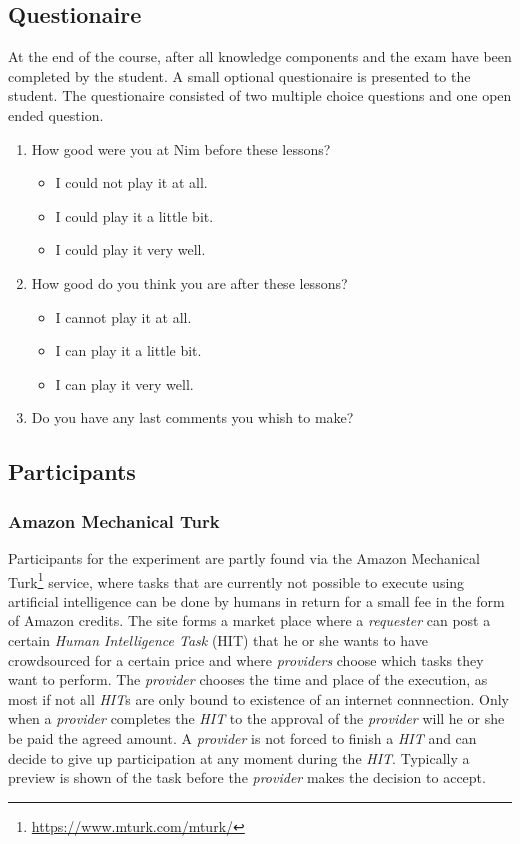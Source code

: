 \subsection{Questionaire}
\label{sec:setup_questionaire}
At the end of the course, after all knowledge components and the exam have been
completed by the student. A small optional questionaire is presented to the
student. The questionaire consisted of two multiple choice questions and one
open ended question.
\begin{enumerate}
	\item How good were you at Nim before these lessons?
		\begin{itemize}
			\item I could not play it at all.
			\item I could play it a little bit.
			\item I could play it very well.
		\end{itemize}
	\item How good do you think you are after these lessons?
		\begin{itemize}
			\item I cannot play it at all.
			\item I can play it a little bit.
			\item I can play it very well.
		\end{itemize}
	\item Do you have any last comments you whish to make?
\end{enumerate}
\subsection{Participants}
\label{sec:setup_dissemination}
\subsubsection{Amazon Mechanical Turk}
Participants for the experiment are partly found via the Amazon Mechanical
Turk\footnote{\url{https://www.mturk.com/mturk/}} service, where tasks that are
currently not possible to execute using artificial intelligence can be done by
humans in return for a small fee in the form of Amazon credits. The site forms
a market place where a \emph{requester} can post a certain \emph{Human
Intelligence Task} (HIT) that he or she wants to have crowdsourced for a
certain price and where \emph{providers} choose which tasks they want to perform.
The \emph{provider} chooses the time and place of the execution, as most if not
all \emph{HIT}s are only bound to existence of an internet connnection. Only
when a \emph{provider} completes the \emph{HIT} to the approval of the
\emph{provider} will he or she be paid the agreed amount. A \emph{provider} is
not forced to finish a \emph{HIT} and can decide to give up participation at
any moment during the \emph{HIT}. Typically a preview is shown of the task
before the \emph{provider} makes the decision to accept.

